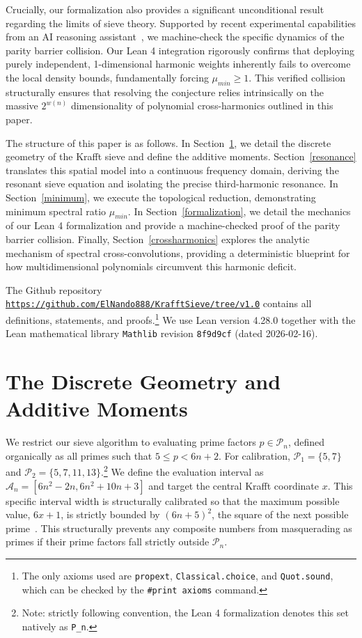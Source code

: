 \documentclass[lean]{AFM}
\renewcommand{\.}{\hskip .75pt}
\newcommand{\sekt}[1]{Section~\ref{#1}}
\begin{document}
Crucially, our formalization also provides a significant unconditional result regarding the limits of
sieve theory. Supported by recent experimental capabilities from an AI reasoning
assistant~\cite{geminiteam2025,Achim2025}, we machine-check the specific dynamics of the parity
barrier collision. Our Lean 4 integration rigorously confirms that deploying purely independent,
1-dimensional harmonic weights inherently fails to overcome the local density bounds, fundamentally
forcing $\mu_{min} \ge 1$. This verified collision structurally ensures that resolving the
conjecture relies intrinsically on the massive $2^{w(n)}$ dimensionality of polynomial
cross-harmonics outlined in this paper.

The structure of this paper is as follows. In \sekt{geometry}, we detail the discrete geometry of
the Krafft sieve and define the additive moments. \sekt{resonance} translates this spatial model
into a continuous frequency domain, deriving the resonant sieve equation and isolating the precise
third-harmonic resonance. In \sekt{minimum}, we execute the topological reduction, demonstrating
minimum spectral ratio $\mu_{min}$. In \sekt{formalization}, we detail the mechanics of our
Lean 4 formalization and provide a machine-checked proof of the parity barrier collision. Finally,
\sekt{crossharmonics} explores the analytic mechanism of spectral cross-convolutions, providing a
deterministic blueprint for how multidimensional polynomials circumvent this harmonic deficit.

The Github repository \href{https://github.com/ElNando888/KrafftSieve/tree/v1.0}
{\texttt{https://github.com/ElNando888/KrafftSieve/tree/v1.0}}
contains all definitions, statements, and proofs.\footnote{The only axioms used are
\texttt{propext}, \texttt{Classical.choice}, and \texttt{Quot.sound}, which can be checked by
the \texttt{\#print axioms} command.} We use Lean version 4.28.0 together with the Lean
mathematical library \texttt{Mathlib} \cite{Mathlib} revision \texttt{8f9d9cf} (dated 2026-02-16).

\section{The Discrete Geometry and Additive Moments} \label{geometry}

We restrict our sieve algorithm to evaluating prime factors $p \in \mathcal{P}_n$, defined organically as
all primes such that $5 \le p < 6n+2$. For calibration, $\mathcal{P}_1 = \{5, 7\}$ and
$\mathcal{P}_2 = \{5, 7, 11, 13\}$.\footnote{Note: strictly following convention, the Lean 4 formalization
denotes this set natively as \texttt{P\_n}.} We define the evaluation interval as
$\mathcal{A}_n = [6n^2 - 2n, 6n^2 + 10n + 3]$ and target the central Krafft coordinate $x$. This specific
interval width is structurally calibrated so that the maximum possible value, $6x+1$, is strictly
bounded by $(6n+5)^2$, the square of the next possible prime~\cite{Portela2026}. This structurally
prevents any composite numbers from masquerading as primes if their prime factors fall strictly
outside $\mathcal{P}_n$.
\end{document}

